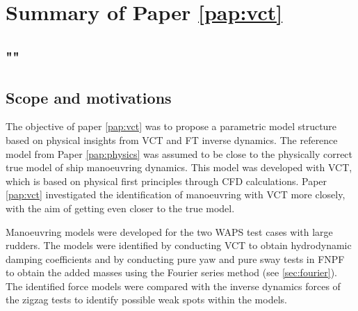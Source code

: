 \section{Summary of Paper \ref{pap:vct}}
\subsection*{""}
\subsection*{Scope and motivations}
The objective of paper \ref{pap:vct} was to propose a parametric model structure based on physical insights from VCT and FT inverse dynamics. The reference model from Paper \ref{pap:physics} was assumed to be close to the physically correct true model of ship manoeuvring dynamics. This model was developed with VCT, which is based on physical first principles through CFD calculations. Paper \ref{pap:vct} investigated the identification of manoeuvring with VCT more closely, with the aim of getting even closer to the true model.

Manoeuvring models were developed for the two WAPS test cases with large rudders. The models were identified by conducting VCT to obtain hydrodynamic damping coefficients and by conducting pure yaw and pure sway tests in FNPF to obtain the added masses using the Fourier series method (see \autoref{sec:fourier}). The identified force models were compared with the inverse dynamics forces of the zigzag tests to identify possible weak spots within the models.

